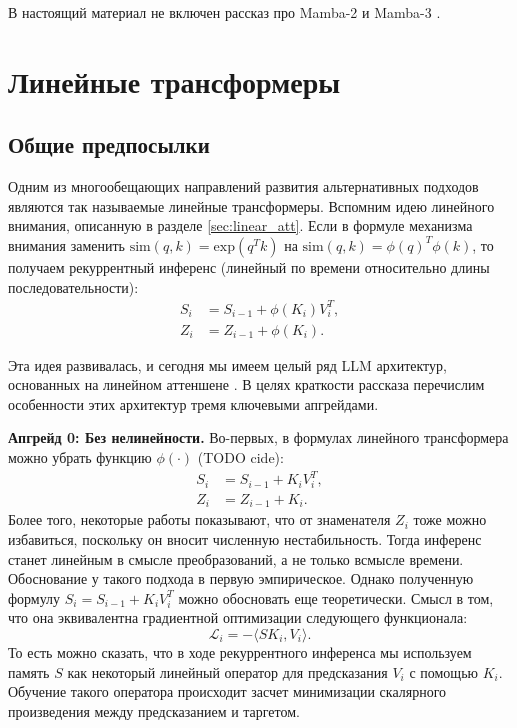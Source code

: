 \documentclass[11pt]{extarticle}
\begin{document}
В настоящий материал не включен рассказ про Mamba-2 \cite{dao2024transformersssmsgeneralizedmodels} и Mamba-3 \cite{anonymous2025mamba}.

\section{Линейные трансформеры}

\subsection{Общие предпосылки}

Одним из многообещающих направлений развития альтернативных подходов являются так называемые линейные трансформеры. Вспомним идею линейного внимания, описанную в разделе \ref{sec:linear_att}. Если в формуле механизма внимания заменить $\text{sim}(q,k)=\text{exp}(q^Tk)$ на $\text{sim}(q,k)=\phi(q)^T\phi(k)$, то получаем рекуррентный инференс (линейный по времени относительно длины последовательности):
\begin{align*}
  S_i&=S_{i-1}+\phi(K_i)V_i^T,\\
  Z_i&=Z_{i-1}+\phi(K_i).
\end{align*}

Эта идея развивалась, и сегодня мы имеем целый ряд LLM архитектур, основанных на линейном аттеншене \cite{yang2025parallelizinglineartransformersdelta, kimiteam2025kimilinearexpressiveefficient, qwen32next}. В целях краткости рассказа перечислим особенности этих архитектур тремя ключевыми апгрейдами.

\textbf{Апгрейд 0: Без нелинейности.} Во-первых, в формулах линейного трансформера можно убрать функцию $\phi(\cdot)$ (TODO cide):
\begin{align*}
  S_i&=S_{i-1}+K_iV_i^T,\\
  Z_i&=Z_{i-1}+K_i.
\end{align*}
Более того, некоторые работы показывают, что от знаменателя $Z_i$ тоже можно избавиться, поскольку он вносит численную нестабильность. Тогда инференс станет линейным в смысле преобразований, а не только всмысле времени. Обоснование у такого подхода в первую эмпирическое. Однако полученную формулу $S_i=S_{i-1}+K_iV_i^T$ можно обосновать еще теоретически. Смысл в том, что она эквивалентна градиентной оптимизации следующего функционала:
\begin{equation*}
\mathcal{L}_i=-\langle SK_i,V_i \rangle.
\end{equation*}
То есть можно сказать, что в ходе рекуррентного инференса мы используем память $S$ как некоторый линейный оператор для предсказания $V_i$ с помощью $K_i$. Обучение такого оператора происходит засчет минимизации скалярного произведения между предсказанием и таргетом.
\end{document}

